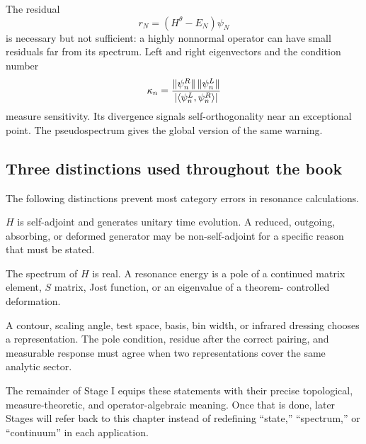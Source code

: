The residual
\begin{equation}
  r_N=(H^\theta-E_N)\psi_N
  \label{eq:complex-residual}
\end{equation}
is necessary but not sufficient: a highly nonnormal operator can have small
residuals far from its spectrum.  Left and right eigenvectors and the
condition number
\begin{equation}
  \kappa_n=
  \frac{\|\psi_n^R\|\,\|\psi_n^L\|}
       {|\langle \psi_n^L,\psi_n^R\rangle|}
  \label{eq:foundations-eigenvalue-condition-number}
\end{equation}
measure sensitivity.  Its divergence signals self-orthogonality near an
exceptional point.  The pseudospectrum gives the global version of the same
warning.

\subsection{Three distinctions used throughout the book}
\label{subsec:three-foundational-distinctions}

The following distinctions prevent most category errors in resonance
calculations.

\begin{description}[style=nextline]
  \item[Closed dynamics versus effective evolution.]
  $H$ is self-adjoint and generates unitary time evolution.  A reduced,
  outgoing, absorbing, or deformed generator may be non-self-adjoint for a
  specific reason that must be stated.

  \item[Spectral value versus continued pole.]
  The spectrum of $H$ is real.  A resonance energy is a pole of a continued
  matrix element, $S$ matrix, Jost function, or an eigenvalue of a theorem-
  controlled deformation.

  \item[Representation choice versus invariant datum.]
  A contour, scaling angle, test space, basis, bin width, or infrared dressing
  chooses a representation.  The pole condition, residue after the correct
  pairing, and measurable response must agree when two representations cover
  the same analytic sector.
\end{description}

The remainder of Stage I equips these statements with their precise
topological, measure-theoretic, and operator-algebraic meaning.  Once that is
done, later Stages will refer back to this chapter instead of redefining
``state,'' ``spectrum,'' or ``continuum'' in each application.
